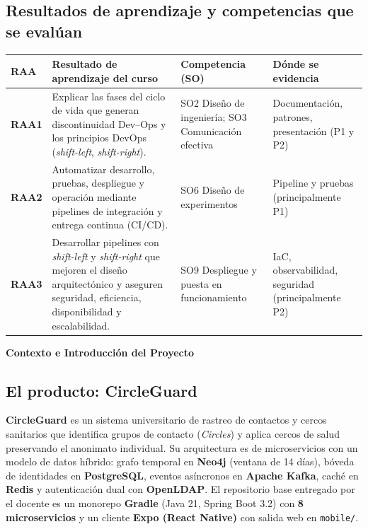 \documentclass[10pt,letterpaper]{article}
\newcommand{\sectionBadge}[1]{%
  \refstepcounter{section}%
  \vspace{0.24cm}%
  \noindent%
  \colorbox{icesiBlue}{\color{white}\rule[-0.08cm]{0pt}{0.42cm}\hspace{0.16cm}\textbf{\normalsize \thesection}\hspace{0.16cm}}%
  \hspace{0.18cm}%
  {\fontsize{9.5}{12}\selectfont\textbf{\color{icesiDark}#1}}\\[-0.10cm]%
  \noindent{\color{icesiDark}\rule{\textwidth}{0.8pt}}\vspace{0.10cm}%
}
\begin{document}
\vspace{0.12cm}

\subsection*{Resultados de aprendizaje y competencias que se evalúan}
\noindent\small
\begin{tabularx}{\textwidth}{|L{1.5cm}|X|L{3.2cm}|L{2.6cm}|}
\hline
{}
\textbf{RAA} & \textbf{Resultado de aprendizaje del curso} & \textbf{Competencia (SO)} & \textbf{Dónde se evidencia} \\ \hline
\textbf{RAA1} & Explicar las fases del ciclo de vida que generan discontinuidad Dev--Ops y los principios DevOps (\textit{shift-left}, \textit{shift-right}). & SO2 Diseño de ingeniería; SO3 Comunicación efectiva & Documentación, patrones, presentación (P1 y P2) \\ \hline
\textbf{RAA2} & Automatizar desarrollo, pruebas, despliegue y operación mediante pipelines de integración y entrega continua (CI/CD). & SO6 Diseño de experimentos & Pipeline y pruebas (principalmente P1) \\ \hline
\textbf{RAA3} & Desarrollar pipelines con \textit{shift-left} y \textit{shift-right} que mejoren el diseño arquitectónico y aseguren seguridad, eficiencia, disponibilidad y escalabilidad. & SO9 Despliegue y puesta en funcionamiento & IaC, observabilidad, seguridad (principalmente P2) \\ \hline
\end{tabularx}

\vspace{0.10cm}

\sectionBadge{Contexto e Introducción del Proyecto}

\subsection{El producto: CircleGuard}
\textbf{CircleGuard} es un sistema universitario de rastreo de contactos y cercos sanitarios que identifica grupos de contacto (\textit{Circles}) y aplica cercos de salud preservando el anonimato individual. Su arquitectura es de microservicios con un modelo de datos híbrido: grafo temporal en \textbf{Neo4j} (ventana de 14 días), bóveda de identidades en \textbf{PostgreSQL}, eventos asíncronos en \textbf{Apache Kafka}, caché en \textbf{Redis} y autenticación dual con \textbf{OpenLDAP}. El repositorio base entregado por el docente es un monorepo \textbf{Gradle} (Java 21, Spring Boot 3.2) con \textbf{8 microservicios} y un cliente \textbf{Expo (React Native)} con salida web en \texttt{mobile/}.
\end{document}
